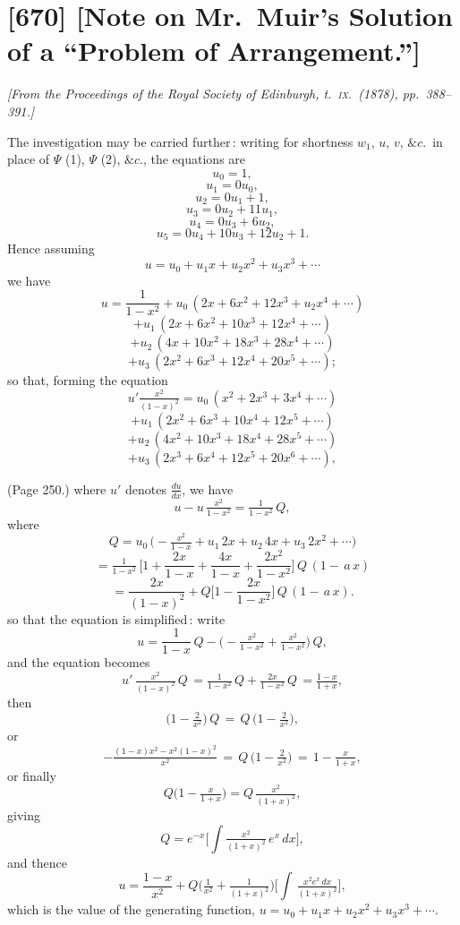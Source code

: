 \documentclass[11pt,a4paper]{book}
\begin{document}
\bigskip

\section{[670] [Note on Mr.\ Muir's Solution of a ``Problem of Arrangement.'']}
\label{sec:670}

\noindent\textit{[From the \emph{Proceedings of the Royal Society of Edinburgh}, t.~\textsc{ix.}\ (1878), pp.~388--391.]}

\medskip

\noindent The investigation may be carried further\,: writing for shortness $w_1$, $u$, $v$, $\&c$.\ in place of $\Psi$ (1), $\Psi$ (2), $\&c$., the equations are
\[
u_0 = 1,
\]
\[
u_1 = 0u_0,
\]
\[
u_2 = 0u_1 + 1,
\]
\[
u_3 = 0u_2 + 11u_1,
\]
\[
u_4 = 0u_3 + 6u_2,
\]
\[
u_5 = 0u_4 + 10u_3 + 12u_2 + 1.
\]
Hence assuming
\[
u = u_0 + u_1 x + u_2 x^2 + u_3 x^3 + \cdots
\]
we have
\[
u = \frac{1}{1 - x^2} + u_0\,(2x + 6x^2 + 12x^3 + u_2 x^4 + \cdots)
\]
\[
+ u_1\,(2 x + 6 x^2 + 10 x^3 + 12 x^4 + \cdots)
\]
\[
+ u_2\,(4 x + 10 x^2 + 18 x^3 + 28 x^4 + \cdots)
\]
\[
+ u_3\,(2 x^2 + 6 x^3 + 12 x^4 + 20 x^5 + \cdots);
\]
so that, forming the equation
\[
u' \tfrac{x^2}{(1 - x)^2} = u_0\,(x^2 + 2 x^3 + 3 x^4 + \cdots)
\]
\[
+ u_1\,(2 x^2 + 6 x^3 + 10 x^4 + 12 x^5 + \cdots)
\]
\[
+ u_2\,(4 x^2 + 10 x^3 + 18 x^4 + 28 x^5 + \cdots)
\]
\[
+ u_3\,(2 x^3 + 6 x^4 + 12 x^5 + 20 x^6 + \cdots),
\]

\medskip

\noindent (Page 250.) where $u'$ denotes $\frac{du}{dx}$, we have
\[
u - u\,\tfrac{x^2}{1 - x^2} = \tfrac{1}{1 - x^2}\,Q,
\]
where
\[
Q = u_0\,\Big(- \tfrac{x^2}{1 - x} + u_1\,2x + u_2\,4x + u_3\,2x^2 + \cdots\Big)
\]
\[
= \tfrac{1}{1 - x^2}\,\Big[1 + \frac{2x}{1 - x} + \frac{4x}{1 - x} + \frac{2x^2}{1 - x^2}\Big]\,Q\,(1 - \,a\,x)
\]
\[
= \frac{2 x}{(1 - x)^2} + Q\Big[1 - \frac{2x}{1 - x^2}\Big]\,Q\,(1 - \,a\,x).
\]
so that the equation is simplified\,: write
\[
u = \frac{1}{1 - x}\,Q - \Big( - \tfrac{x^2}{1 - x^2} + \tfrac{x^2}{1 - x^2}\Big)\,Q,
\]
and the equation becomes
\[
u'\,\tfrac{x^2}{(1 - x)^2}\,Q\,= \tfrac{1}{1 - x^2}\,Q + \tfrac{2x}{1 - x^2}\,Q\,= \tfrac{1 - x}{1 + x},
\]
then
\[
\Big(1 - \tfrac{2}{x^2}\Big)\,Q\,= \,Q\,\big(1 - \tfrac{2}{x^2}\big),
\]
or
\[
- \tfrac{(1 - x)x^2 - x^2(1 - x)^2}{x^2}\,= \,Q\,\Big(1 - \tfrac{2}{x^2}\Big)\,= \,1 - \tfrac{x}{1 + x},
\]
or finally
\[
Q\big(1 - \tfrac{x}{1 + x}\big) = Q\,\tfrac{x^2}{(1 + x)^2},
\]
giving
\[
Q = e^{-x}\Big[\int \tfrac{x^2}{(1 + x)^2}\,e^x\,dx\Big],
\]
and thence
\[
u = \frac{1 - x}{x^2} + Q\big(\tfrac{1}{x^2} + \tfrac{1}{(1 + x)^2}\big)\Big[\int\,\tfrac{x^2 e^x\,dx}{(1 + x)^2}\Big],
\]
which is the value of the generating function, $u = u_0 + u_1 x + u_2 x^2 + u_3 x^3 + \cdots$.
\clearpage
\end{document}
